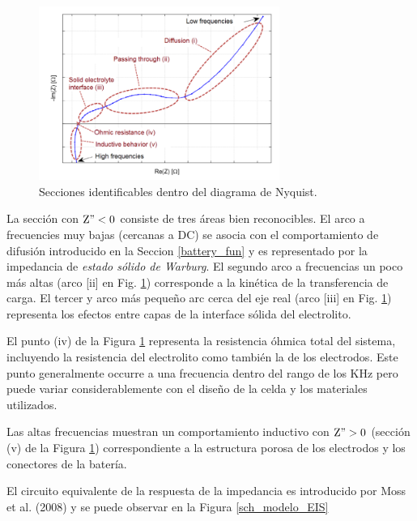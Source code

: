 \documentclass[10pt,a4paper]{article}
\begin{document}
\begin{figure}[h!]
    \begin{center}
	\includegraphics[width=0.7\textwidth]{EIS_nyquist_section.png}
	\caption{Secciones identificables dentro del diagrama de Nyquist.}
	\label{EIS_nyquist_sections}
    \end{center}
\end{figure}

\noindent La secci\'on con $\mathrm{Z" < 0}$ consiste de tres \'areas bien 
reconocibles. El arco a frecuencies muy bajas (cercanas a DC) se asocia con el 
comportamiento de difusi\'on introducido en la Seccion \ref{battery_fun} y es 
representado por la impedancia de \emph{estado s\'olido de Warburg}. El segundo 
arco a frecuencias un poco m\'as altas (arco [ii] en Fig. 
\ref{EIS_nyquist_sections}) corresponde a la kin\'etica de la transferencia de 
carga. El tercer y arco m\'as pequeño arc cerca del eje real (arco [iii] en Fig. 
\ref{EIS_nyquist_sections}) representa los efectos entre capas de la interface 
s\'olida del electrolito.

\noindent El punto (iv) de la Figura \ref{EIS_nyquist_sections} representa la 
resistencia \'ohmica total del sistema, incluyendo la resistencia del 
electrolito como tambi\'en la de los electrodos. Este punto generalmente occurre 
a una frecuencia dentro del rango de los KHz pero puede variar considerablemente 
con el diseño de la celda y los materiales utilizados.

\noindent Las altas frecuencias muestran un comportamiento inductivo con 
$\mathrm{Z" > 0}$ (secci\'on (v) de la Figura \ref{EIS_nyquist_sections}) 
correspondiente a la estructura porosa de los electrodos y los conectores de la 
bater\'ia.

\noindent El circuito equivalente de la respuesta de la impedancia es
introducido por Moss et al. (2008) y se puede observar en la Figura
\ref{sch_modelo_EIS}
\end{document}

